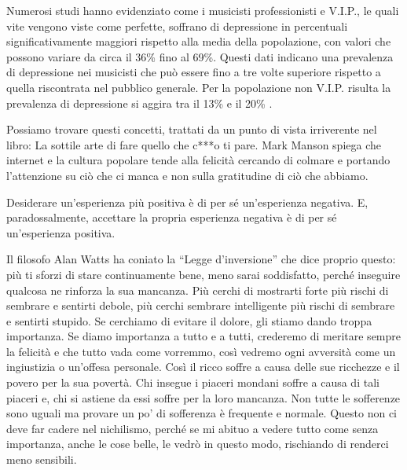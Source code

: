 \documentclass[12pt]{book} %
\begin{document}
Numerosi studi hanno evidenziato come i musicisti professionisti e V.I.P., le quali vite vengono viste come perfette, soffrano di depressione in percentuali significativamente maggiori rispetto alla media della popolazione, con valori che possono variare da circa il 36\% fino al 69\%. Questi dati indicano una prevalenza di depressione nei musicisti che può essere fino a tre volte superiore rispetto a quella riscontrata nel pubblico generale. Per la popolazione non V.I.P. risulta la prevalenza di depressione si aggira tra il 13\% e il 20\%   .

Possiamo trovare questi concetti, trattati da un punto di vista irriverente nel libro: La sottile arte di fare quello
che c***o ti pare. Mark Manson spiega che internet e la cultura popolare
tende alla felicità cercando di colmare e portando l'attenzione su ciò che ci manca e non sulla gratitudine di ciò che abbiamo.

Desiderare un'esperienza più positiva è di per sé un'esperienza negativa. 
E, paradossalmente, accettare la propria esperienza negativa è di per sé un'esperienza positiva.

Il filosofo Alan Watts ha coniato la “Legge d'inversione” che dice proprio questo: 
più ti sforzi di stare continuamente bene, meno sarai soddisfatto, perché inseguire qualcosa ne rinforza la sua mancanza. Più cerchi di mostrarti forte più rischi di sembrare e sentirti debole, più cerchi sembrare intelligente più rischi di sembrare e sentirti stupido. Se cerchiamo di evitare il dolore, gli stiamo dando troppa importanza. Se diamo importanza a tutto e a tutti, crederemo di
meritare sempre la felicità e che tutto vada come vorremmo, così vedremo ogni avversità come un ingiustizia o
un'offesa personale. Così il ricco soffre a causa delle sue ricchezze e il povero per la sua
povertà. Chi insegue i piaceri mondani soffre a causa di tali piaceri e, chi si astiene da essi soffre per la loro
mancanza. Non tutte le sofferenze sono uguali ma provare un po' di sofferenza è frequente e normale.
Questo non ci deve far cadere nel nichilismo, perché se mi abituo a vedere tutto come senza importanza, anche le cose belle, le vedrò in questo modo, rischiando di renderci meno sensibili.
\end{document}
